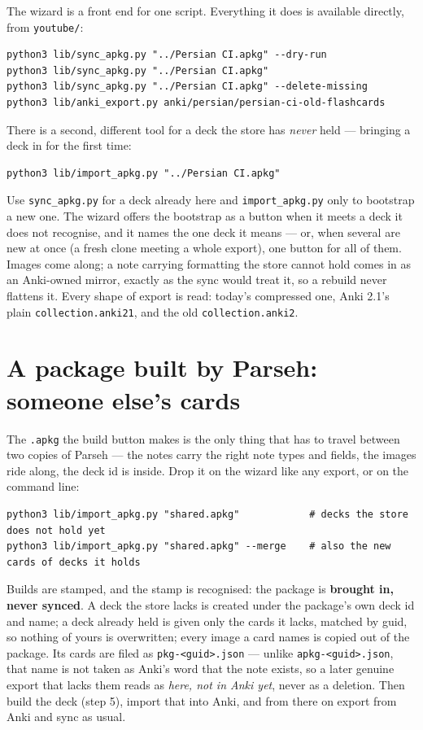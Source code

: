 \documentclass[11pt,oneside]{report}
\newcommand{\file}[1]{\texttt{#1}}
\begin{document}
The wizard is a front end for one script. Everything it does is available
directly, from \file{youtube/}:

\begin{lstlisting}
python3 lib/sync_apkg.py "../Persian CI.apkg" --dry-run
python3 lib/sync_apkg.py "../Persian CI.apkg"
python3 lib/sync_apkg.py "../Persian CI.apkg" --delete-missing
python3 lib/anki_export.py anki/persian/persian-ci-old-flashcards
\end{lstlisting}

There is a second, different tool for a deck the store has \emph{never}
held --- bringing a deck in for the first time:

\begin{lstlisting}
python3 lib/import_apkg.py "../Persian CI.apkg"
\end{lstlisting}

Use \file{sync\_apkg.py} for a deck already here and \file{import\_apkg.py}
only to bootstrap a new one. The wizard offers the bootstrap as a button
when it meets a deck it does not recognise, and it names the one deck it
means --- or, when several are new at once (a fresh clone meeting a whole
export), one button for all of them. Images come along; a note carrying
formatting the store cannot hold comes in as an Anki-owned mirror, exactly
as the sync would treat it, so a rebuild never flattens it. Every shape of
export is read: today's compressed one, Anki 2.1's plain
\file{collection.anki21}, and the old \file{collection.anki2}.

\section{A package built by Parseh: someone else's cards}
\label{sec:shared}

The \file{.apkg} the build button makes is the only thing that has to
travel between two copies of Parseh --- the notes carry the right note
types and fields, the images ride along, the deck id is inside. Drop it on
the wizard like any export, or on the command line:

\begin{lstlisting}
python3 lib/import_apkg.py "shared.apkg"            # decks the store does not hold yet
python3 lib/import_apkg.py "shared.apkg" --merge    # also the new cards of decks it holds
\end{lstlisting}

Builds are stamped, and the stamp is recognised: the package is
\textbf{brought in, never synced}. A deck the store lacks is created under
the package's own deck id and name; a deck already held is given only the
cards it lacks, matched by guid, so nothing of yours is overwritten; every
image a card names is copied out of the package. Its cards are filed as
\file{pkg-<guid>.json} --- unlike \file{apkg-<guid>.json}, that name is not
taken as Anki's word that the note exists, so a later genuine export that
lacks them reads as \emph{here, not in Anki yet}, never as a deletion. Then
build the deck (step 5), import that into Anki, and from there on export
from Anki and sync as usual.
\end{document}
